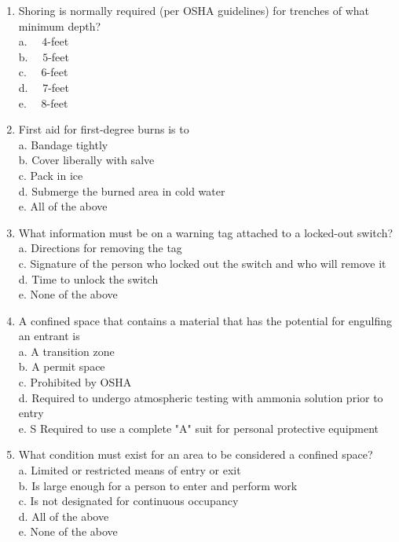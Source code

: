 \documentclass{article}
\begin{document}
\begin{enumerate}
\item Shoring is normally required (per OSHA guidelines) for trenches of what minimum depth?\\
a. $\quad 4$-feet\\
b. $\quad 5$-feet\\
c. $\quad 6$-feet\\
d. $\quad 7$-feet\\
e. $\quad 8$-feet\\
  \item First aid for first-degree burns is to\\
a. Bandage tightly\\
b. Cover liberally with salve\\
c. Pack in ice\\
d. Submerge the burned area in cold water\\
e. All of the above\\
  \item What information must be on a warning tag attached to a locked-out switch?\\
a. Directions for removing the tag\\
c. Signature of the person who locked out the switch and who will remove it\\
d. Time to unlock the switch\\
e. None of the above\\
  \item A confined space that contains a material that has the potential for engulfing an entrant is\\
a. A transition zone\\
b. A permit space\\
c. Prohibited by OSHA\\
d. Required to undergo atmospheric testing with ammonia solution prior to entry\\
e. S Required to use a complete "A" suit for personal protective equipment\\
 \item What condition must exist for an area to be considered a confined space?\\
a. Limited or restricted means of entry or exit\\
b. Is large enough for a person to enter and perform work\\
c. Is not designated for continuous occupancy\\
d. All of the above\\
e. None of the above\\

\end{enumerate}
\end{document}
